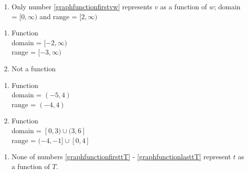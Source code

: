 \documentclass{ximera}
\begin{document}
\begin{enumerate}
\setcounter{enumi}{\value{HW}}

\item Only number \ref{graphfunctionfirstvw} represents $v$ as a function of $w$;  domain = $[0, \infty)$ and range = $[2, \infty)$

\setcounter{HW}{\value{enumi}}
\end{enumerate}

\begin{multicols}{2}
\begin{enumerate}
\setcounter{enumi}{\value{HW}}

\item  Function \\  domain =  $[-2, \infty)$ \\ range = $[-3, \infty)$

\vfill

\columnbreak

\item Not a function

\setcounter{HW}{\value{enumi}}
\end{enumerate}
\end{multicols}


\begin{multicols}{2}
\begin{enumerate}
\setcounter{enumi}{\value{HW}}

\item Function \\  domain =  $(-5, 4)$ \\ range = $(-4, 4)$

\vfill

\columnbreak

\item  Function \\ domain = $[0,3) \cup (3,6]$ \\ range = $(-4,-1] \cup [0,4]$

\setcounter{HW}{\value{enumi}}
\end{enumerate}
\end{multicols}

\begin{enumerate}
\setcounter{enumi}{\value{HW}}

\item None of numbers \ref{graphfunctionfirsttT} - \ref{graphfunctionlasttT}  represent $t$ as a function of $T$.

\setcounter{HW}{\value{enumi}}
\end{enumerate}
\end{document}
